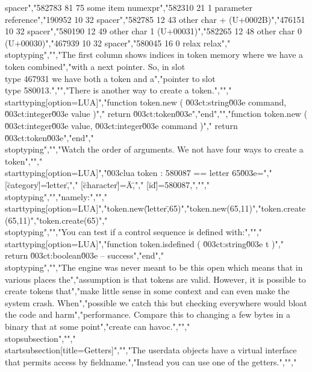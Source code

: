 spacer","582783   81   75  some item            numexpr","582310   21    1  parameter reference","190952   10   32  spacer","582785   12   43  other char           + (U+0002B)","476151   10   32  spacer","580190   12   49  other char           1 (U+00031)","582265   12   48  other char           0 (U+00030)","467939   10   32  spacer","580045   16    0  relax                relax","\\stoptyping","","The first column shows indices in token memory where we have a token combined","with a next pointer. So, in slot \\type {467931} we have both a token and a","pointer to slot \\type {580013}.","","There is another way to create a token.","","\\starttyping[option=LUA]","function token.new ( \u003ct:string\u003e command, \u003ct:integer\u003e value )","    return \u003ct:token\u003e","end","","function token.new ( \u003ct:integer\u003e value, \u003ct:integer\u003e command )","    return \u003ct:token\u003e","end","\\stoptyping","","Watch the order of arguments. We not have four ways to create a token","","\\starttyping[option=LUA]","\u003clua token : 580087 == letter 65\u003e={"," [\"category\"]=\"letter\","," [\"character\"]=\"A\","," [\"id\"]=580087,","}","\\stoptyping","","namely:","","\\starttyping[option=LUA]","token.new(\"letter\",65)","token.new(65,11)","token.create(65,11)","token.create(65)","\\stoptyping","","You can test if a control sequence is defined with:","","\\starttyping[option=LUA]","function token.isdefined ( \u003ct:string\u003e t )","    return \u003ct:boolean\u003e -- success","end","\\stoptyping","","The engine was never meant to be this open which means that in various places the","assumption is that tokens are valid. However, it is possible to create tokens that","make little sense in some context and can even make the system crash. When","possible we catch this but checking everywhere would bloat the code and harm","performance. Compare this to changing a few bytes in a binary that at some point","create can havoc.","","\\stopsubsection","","\\startsubsection[title={Getters}]","","The userdata objects have a virtual interface that permits access by fieldname.","Instead you can use one of the getters.","","%